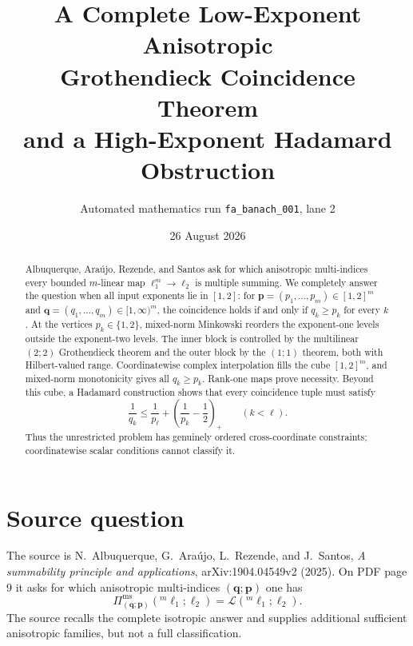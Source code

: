 \documentclass[11pt]{article}
\title{A Complete Low-Exponent Anisotropic\\
Grothendieck Coincidence Theorem\\
\large and a High-Exponent Hadamard Obstruction}
\author{Automated mathematics run \texttt{fa\_banach\_001}, lane 2}
\date{26 August 2026}
\newcommand{\Lcal}{\mathcal L}
\begin{document}
\maketitle

\begin{center}
\end{center}

\begin{abstract}
Albuquerque, Ara\'ujo, Rezende, and Santos ask for which anisotropic
multi-indices every bounded \(m\)-linear map
\(\ell_1^m\to\ell_2\) is multiple summing.  We completely answer the
question when all input exponents lie in \([1,2]\): for
\(\mathbf p=(p_1,\ldots,p_m)\in[1,2]^m\) and
\(\mathbf q=(q_1,\ldots,q_m)\in[1,\infty)^m\), the coincidence holds if
and only if \(q_k\ge p_k\) for every \(k\).  At the vertices
\(p_k\in\{1,2\}\), mixed-norm Minkowski reorders the exponent-one levels
outside the exponent-two levels.  The inner block is controlled by the
multilinear \((2;2)\) Grothendieck theorem and the outer block by the
\((1;1)\) theorem, both with Hilbert-valued range.  Coordinatewise complex
interpolation fills the cube \([1,2]^m\), and mixed-norm monotonicity gives
all \(q_k\ge p_k\).  Rank-one maps prove necessity.  Beyond this cube, a
Hadamard construction shows that every coincidence tuple must satisfy
\[
 \frac1{q_k}\le \frac1{p_\ell}
 +\left(\frac1{p_k}-\frac12\right)_+
 \qquad (k<\ell).
\]
Thus the unrestricted problem has genuinely ordered cross-coordinate
constraints; coordinatewise scalar conditions cannot classify it.
\end{abstract}

\section{Source question}

The source is N.~Albuquerque, G.~Ara\'ujo, L.~Rezende, and J.~Santos,
\emph{A summability principle and applications}, arXiv:1904.04549v2
(2025)\cite{source}.  On PDF page 9 it asks for which anisotropic
multi-indices \((\mathbf q;\mathbf p)\) one has
\[
 \Pi^{\mathrm{ms}}_{(\mathbf q;\mathbf p)}
   ({}^m\ell_1;\ell_2)=\Lcal({}^m\ell_1;\ell_2).
\]
The source recalls the complete isotropic answer and supplies additional
sufficient anisotropic families, but not a full classification.
\end{document}
